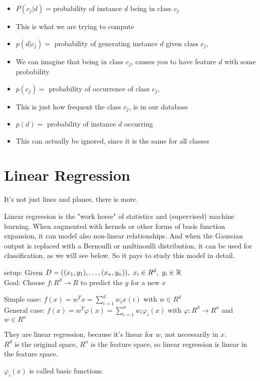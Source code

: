 \documentclass{article}
\begin{document}
\begin{itemize}
\item $P(c_j|d) = $probability of instance $d$ being in class $c_j$
\item [] This is what we are trying to compute
\item $p(d | c_j) =$ probability of generating instance $d$ given class $c_j$,
\item [] We can imagine that being in class $c_j$, causes you to have feature $d$ with some probability 
\item $p(c_j) =$ probability of occurrence of class $c_j$, 
\item [] This is just how frequent the class $c_j$, is in our database
\item $p(d) =$ probability of instance $d$ occurring
\item [] This can actually be ignored, since it is the same for all classes
\end{itemize}

\section{Linear Regression}
It's not just lines and planes, there is more.

Linear regression is the "work horse" of statistics and (supervised) machine learning. 
When augmented with kernels or other forms of basis function expansion, it can model also non-linear relationships. 
And when the Gaussian output is replaced with a Bernoulli or multinoulli distribution, 
it can be used for classification, as we will see below. So it pays to study this model in detail.

setup: Given $D = ((x_1, y_1), \ldots, (x_n, y_n)),\ x_i \in R^d,\ y_i \in \mathbb{R}$\\
Goal: Choose $f: R^d \rightarrow R$ to predict the $y$ for a new $x$

Simple case: $f(x) = w^T x = \sum_{i=1}^d w_i x(i)$ with $w \in R^d$\\
General case: $f(x) = w^T \varphi(x) = \sum_{i=1}^n w_i \varphi_i(x)$ with $\varphi: R^d \rightarrow R^n$ and $w \in R^n$

They are linear regression, because it's linear for $w$, not necessarily in $x$.\\
$R^d$ is the original space, $R^n$ is the feature space, so linear regression is linear in the feature space.

$\varphi_i(x)$ is called basic functions.
\end{document}
